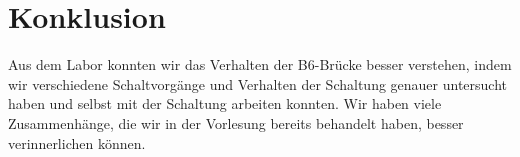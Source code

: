 \documentclass{article}
\begin{document}
\section{Konklusion}
\label{sec:konklusion}

Aus dem Labor konnten wir das Verhalten der B6-Brücke besser verstehen, indem wir verschiedene Schaltvorgänge und Verhalten der Schaltung genauer untersucht haben und selbst mit der Schaltung arbeiten konnten. Wir haben viele Zusammenhänge, die wir in der Vorlesung bereits behandelt haben, besser verinnerlichen können.
\end{document}
